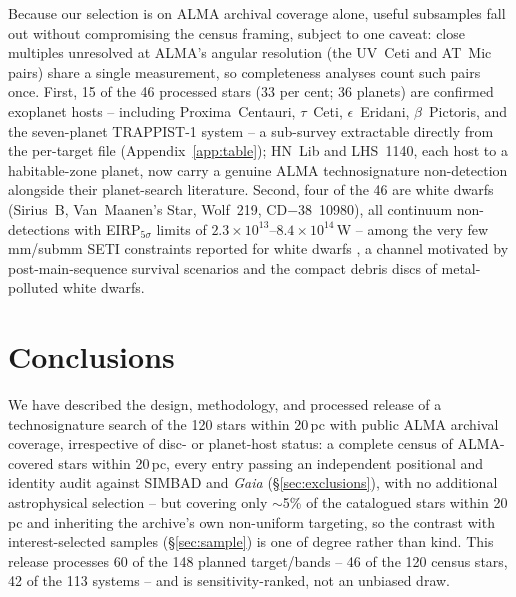 \documentclass{openjournal}
\begin{document}
Because our selection is on ALMA archival coverage alone, useful
subsamples fall out without compromising the census framing, subject
to one caveat: close multiples unresolved at ALMA's angular
resolution (the UV~Ceti and AT~Mic pairs) share a single measurement,
so completeness analyses count such pairs once. First, 15 of the 46
processed stars (33 per cent; 36 planets) are confirmed exoplanet
hosts -- including Proxima~Centauri, $\tau$~Ceti,
$\epsilon$~Eridani, $\beta$~Pictoris, and the seven-planet TRAPPIST-1
system -- a sub-survey extractable directly from
the per-target file (Appendix~\ref{app:table}); HN~Lib and LHS~1140, each host to a
habitable-zone planet, now carry a genuine ALMA technosignature
non-detection alongside their planet-search literature. Second, four
of the 46 are white dwarfs (Sirius~B, Van~Maanen's Star, Wolf~219,
CD$-$38~10980), all continuum non-detections with EIRP$_{5\sigma}$
limits of $2.3\times10^{13}$--$8.4\times10^{14}$\,W -- among the very
few mm/submm SETI constraints reported for white dwarfs
\citep{PollutedWD2026}, a channel motivated by post-main-sequence
survival scenarios and the compact debris discs of metal-polluted
white dwarfs.

\section{Conclusions}
\label{sec:conclusions}

We have described the design, methodology, and processed release of a
technosignature search of the 120 stars within 20\,pc with public
ALMA archival coverage, irrespective of disc- or planet-host status:
a complete census of ALMA-covered stars within 20\,pc, every entry
passing an independent positional and identity audit against SIMBAD
and \emph{Gaia} (\S\ref{sec:exclusions}), with no additional
astrophysical selection -- but covering only $\sim$5\% of the
catalogued stars within 20\,pc and inheriting the archive's own
non-uniform targeting, so the contrast with interest-selected samples
(\S\ref{sec:sample}) is one of degree rather than kind. This release
processes 60 of the 148 planned target/bands -- 46 of the 120 census
stars, 42 of the 113 systems -- and is sensitivity-ranked, not an
unbiased draw.
\end{document}
